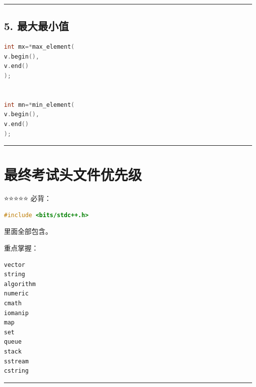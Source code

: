 \documentclass[9pt,twocolumn]{extarticle}
\begin{document}
\noindent\rule{\linewidth}{0.4pt}

\subsection{5. 最大最小值}
\begin{lstlisting}[language=C++]
int mx=*max_element(
v.begin(),
v.end()
);


int mn=*min_element(
v.begin(),
v.end()
);
\end{lstlisting}

\noindent\rule{\linewidth}{0.4pt}

\section{最终考试头文件优先级}

⭐⭐⭐⭐⭐ 必背：
\begin{lstlisting}[language=C++]
#include <bits/stdc++.h>
\end{lstlisting}
里面全部包含。

重点掌握：
\begin{lstlisting}
vector
string
algorithm
numeric
cmath
iomanip
map
set
queue
stack
sstream
cstring
\end{lstlisting}

\noindent\rule{\linewidth}{0.4pt}
\end{document}

